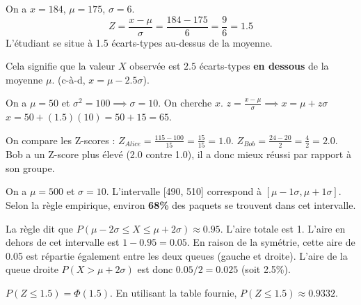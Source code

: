 \begin{correctionbox}
On a $x=184$, $\mu=175$, $\sigma=6$.
$$Z = \frac{x - \mu}{\sigma} = \frac{184 - 175}{6} = \frac{9}{6} = 1.5$$
L'étudiant se situe à 1.5 écarts-types au-dessus de la moyenne.
\end{correctionbox}

\begin{correctionbox}
Cela signifie que la valeur $X$ observée est $2.5$ écarts-types \textbf{en dessous} de la moyenne $\mu$. (c-à-d, $x = \mu - 2.5\sigma$).
\end{correctionbox}

\begin{correctionbox}
On a $\mu=50$ et $\sigma^2=100 \implies \sigma=10$. On cherche $x$.
$z = \frac{x - \mu}{\sigma} \implies x = \mu + z\sigma$
$x = 50 + (1.5)(10) = 50 + 15 = 65$.
\end{correctionbox}

\begin{correctionbox}
On compare les Z-scores :
$Z_{Alice} = \frac{115 - 100}{15} = \frac{15}{15} = 1.0$.
$Z_{Bob} = \frac{24 - 20}{2} = \frac{4}{2} = 2.0$.
Bob a un Z-score plus élevé (2.0 contre 1.0), il a donc mieux réussi par rapport à son groupe.
\end{correctionbox}

\begin{correctionbox}
On a $\mu=500$ et $\sigma=10$. L'intervalle [490, 510] correspond à $[\mu - 1\sigma, \mu + 1\sigma]$.
Selon la règle empirique, environ \textbf{68\%} des paquets se trouvent dans cet intervalle.
\end{correctionbox}

\begin{correctionbox}
La règle dit que $P(\mu - 2\sigma \le X \le \mu + 2\sigma) \approx 0.95$.
L'aire totale est 1. L'aire en dehors de cet intervalle est $1 - 0.95 = 0.05$.
En raison de la symétrie, cette aire de 0.05 est répartie également entre les deux queues (gauche et droite).
L'aire de la queue droite $P(X > \mu + 2\sigma)$ est donc $0.05 / 2 = 0.025$ (soit 2.5\%).
\end{correctionbox}

\begin{correctionbox}
$P(Z \le 1.5) = \Phi(1.5)$. En utilisant la table fournie, $P(Z \le 1.5) \approx 0.9332$.
\end{correctionbox}

